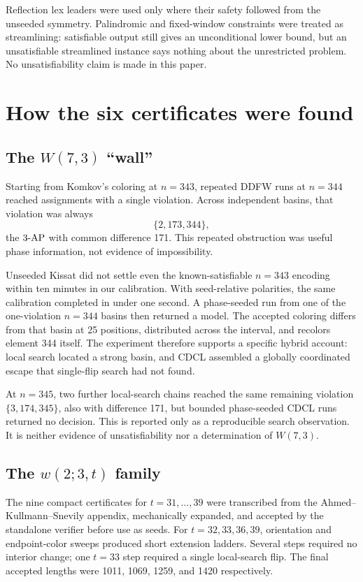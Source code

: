 \documentclass[11pt]{article}
\newcommand{\ap}{\textnormal{-AP}}
\begin{document}
Reflection lex leaders were used only where their safety followed from the
unseeded symmetry.  Palindromic and fixed-window constraints were treated as
streamlining: satisfiable output still gives an unconditional lower bound,
but an unsatisfiable streamlined instance says nothing about the unrestricted
problem.  No unsatisfiability claim is made in this paper.

\section{How the six certificates were found}
\label{sec:case-studies}

\subsection{The \texorpdfstring{\(W(7,3)\)}{W(7,3)} ``wall''}

Starting from Komkov's coloring at \(n=343\), repeated DDFW runs at
\(n=344\) reached assignments with a single violation.  Across independent
basins, that violation was always
\[
  \{2,173,344\},
\]
the \(3\ap\) with common difference 171.  This repeated obstruction was
useful phase information, not evidence of impossibility.

Unseeded Kissat did not settle even the known-satisfiable \(n=343\) encoding
within ten minutes in our calibration.  With seed-relative polarities, the
same calibration completed in under one second.  A phase-seeded run from one
of the one-violation \(n=344\) basins then returned a model.  The accepted
coloring differs from that basin at 25 positions, distributed across the
interval, and recolors element 344 itself.  The experiment therefore
supports a specific hybrid account: local search located a strong basin, and
CDCL assembled a globally coordinated escape that single-flip search had not
found.

At \(n=345\), two further local-search chains reached the same remaining
violation \(\{3,174,345\}\), also with difference 171, but bounded
phase-seeded CDCL runs returned no decision.  This is reported only as a
reproducible search observation.  It is neither evidence of unsatisfiability
nor a determination of \(W(7,3)\).

\subsection{The \texorpdfstring{\(w(2;3,t)\)}{w(2;3,t)} family}

The nine compact certificates for \(t=31,\ldots,39\) were transcribed from
the Ahmed--Kullmann--Snevily appendix, mechanically expanded, and accepted
by the standalone verifier before use as seeds.  For \(t=32,33,36,39\),
orientation and endpoint-color sweeps produced short extension ladders.
Several steps required no interior change; one \(t=33\) step required a
single local-search flip.  The final accepted lengths were 1011, 1069, 1259,
and 1420 respectively.
\end{document}
